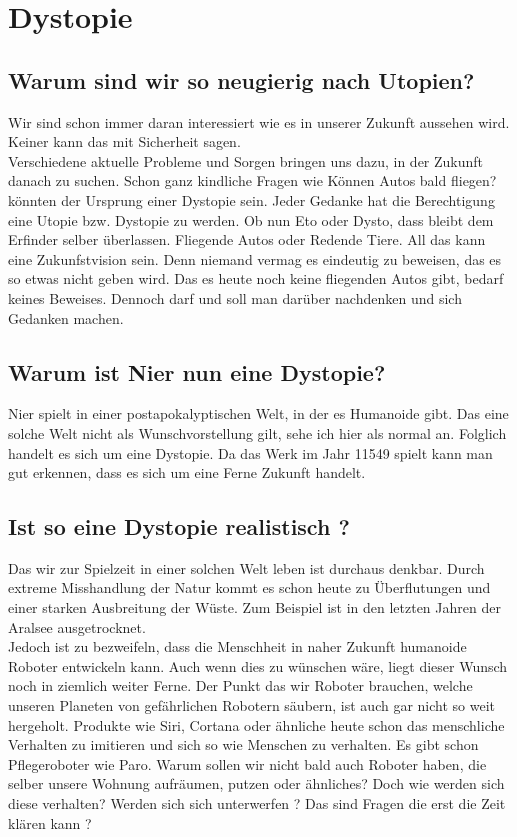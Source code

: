 
\newpage
\chapter{Dystopie}


\section{Warum sind wir so neugierig nach Utopien?}
Wir sind schon immer daran interessiert wie es in unserer Zukunft aussehen wird. Keiner kann das mit Sicherheit sagen. \\
Verschiedene aktuelle Probleme und Sorgen bringen uns dazu, in der Zukunft danach zu suchen. Schon ganz kindliche Fragen wie \dq Können Autos bald fliegen? \dq könnten der Ursprung einer Dystopie sein. Jeder Gedanke hat die Berechtigung eine Utopie bzw. Dystopie zu werden. Ob nun Eto oder Dysto, dass bleibt dem Erfinder selber überlassen. Fliegende Autos oder Redende Tiere. All das kann eine Zukunfstvision sein. Denn niemand vermag es eindeutig zu beweisen, das es so etwas nicht geben wird. Das es heute noch keine fliegenden Autos gibt, bedarf keines Beweises. Dennoch darf und soll man darüber nachdenken und sich Gedanken machen. ~\cite{dysto}


\section{Warum ist Nier nun eine Dystopie?}
Nier spielt in einer postapokalyptischen Welt, in der es Humanoide gibt. Das eine solche Welt nicht als Wunschvorstellung gilt, sehe ich hier als normal an. Folglich handelt es sich um eine Dystopie. Da das Werk im Jahr 11549 spielt kann man gut erkennen, dass es sich um eine Ferne Zukunft handelt.


\section{Ist so eine Dystopie realistisch ?}
Das wir zur Spielzeit in einer solchen Welt leben ist durchaus denkbar. Durch extreme Misshandlung der Natur kommt es schon heute zu Überflutungen und einer starken Ausbreitung der Wüste. Zum Beispiel ist in den letzten Jahren der Aralsee ausgetrocknet. \\
Jedoch ist zu bezweifeln, dass die Menschheit in naher Zukunft humanoide Roboter entwickeln kann. Auch wenn dies zu wünschen wäre, liegt dieser Wunsch noch in ziemlich weiter Ferne. Der Punkt das wir Roboter brauchen, welche unseren Planeten von gefährlichen Robotern säubern, ist auch gar nicht so weit hergeholt. Produkte wie Siri, Cortana oder ähnliche heute schon das menschliche Verhalten zu imitieren und sich so wie Menschen zu verhalten. Es gibt schon Pflegeroboter wie Paro. Warum sollen wir nicht bald auch Roboter haben, die selber unsere Wohnung aufräumen, putzen oder ähnliches? Doch wie werden sich diese verhalten? Werden sich sich unterwerfen ? Das sind Fragen die erst die Zeit klären kann ? 


